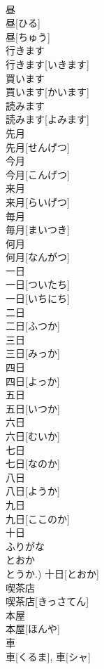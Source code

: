 \documentclass[8pt]{extreport}
\begin{document}
\begin{CJK}{UTF8}{min}
\\	昼	
\\	昼[ひる] 
\\	昼[ちゅう]	
\\	行きます	
\\	行きます[いきます]	
\\	買います	
\\	買います[かいます]	
\\	読みます	
\\	読みます[よみます]	
\\	先月	
\\	先月[せんげつ]	
\\	今月	
\\	今月[こんげつ]	
\\	来月	
\\	来月[らいげつ]	
\\	毎月	
\\	毎月[まいつき]	
\\	何月	
\\	何月[なんがつ]	
\\	一日	
\\	一日[ついたち] 
\\	一日[いちにち]	
\\	二日	
\\	二日[ふつか]	
\\	三日	
\\	三日[みっか]	
\\	四日	
\\	四日[よっか]	
\\	五日	
\\	五日[いつか]	
\\	六日	
\\	六日[むいか]	
\\	七日	
\\	七日[なのか]	
\\	八日	
\\	八日[ようか]	
\\	九日	
\\	九日[ここのか]	
\\	十日	
\\	ふりがな 
\\	とおか 
\\	とうか.)	十日[とおか]	
\\	喫茶店	
\\	喫茶店[きっさてん]	
\\	本屋	
\\	本屋[ほんや]	
\\	車	
\\	車[くるま], 車[シャ]	

\end{CJK}
\end{document}
